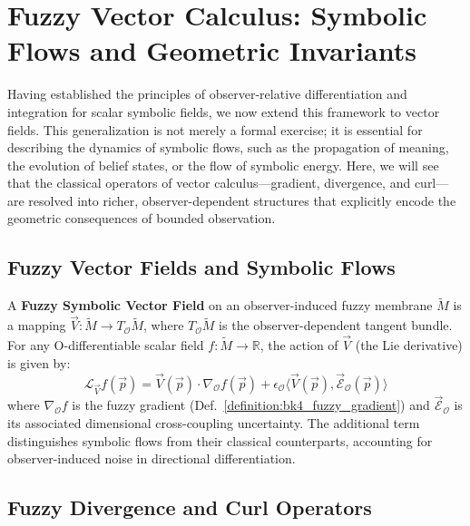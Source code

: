 \section[Fuzzy Vector Calculus]{Fuzzy Vector Calculus: Symbolic Flows and Geometric Invariants}
\label{sec:bk4_fuzzy_vector_calculus}

Having established the principles of observer-relative differentiation and integration for scalar symbolic fields, we now extend this framework to vector fields. This generalization is not merely a formal exercise; it is essential for describing the dynamics of symbolic flows, such as the propagation of meaning, the evolution of belief states, or the flow of symbolic energy. Here, we will see that the classical operators of vector calculus---gradient, divergence, and curl---are resolved into richer, observer-dependent structures that explicitly encode the geometric consequences of bounded observation.

\subsection{Fuzzy Vector Fields and Symbolic Flows}
\label{subsec:bk4_fuzzy_vector_fields}

\begin{definition}
\label{definition:bk4_fuzzy_vector_field}
A \textbf{Fuzzy Symbolic Vector Field} on an observer-induced fuzzy membrane $\tilde{M}$ is a mapping $\vec{V}: \tilde{M} \to T_{\mathcal{O}}\tilde{M}$, where $T_{\mathcal{O}}\tilde{M}$ is the observer-dependent tangent bundle. For any O-differentiable scalar field $f: \tilde{M} \to \mathbb{R}$, the action of $\vec{V}$ (the Lie derivative) is given by:
\[
\mathcal{L}_{\vec{V}} f(\vec{p}) = \vec{V}(\vec{p}) \cdot \nabla_{\mathcal{O}} f(\vec{p}) + \epsilon_{\mathcal{O}} \langle \vec{V}(\vec{p}), \vec{\mathcal{E}}_{\mathcal{O}}(\vec{p}) \rangle
\]
where $\nabla_{\mathcal{O}}f$ is the fuzzy gradient (Def.~\ref{definition:bk4_fuzzy_gradient}) and $\vec{\mathcal{E}}_{\mathcal{O}}$ is its associated dimensional cross-coupling uncertainty. The additional term distinguishes symbolic flows from their classical counterparts, accounting for observer-induced noise in directional differentiation.
\end{definition}

\subsection{Fuzzy Divergence and Curl Operators}
\label{subsec:bk4_fuzzy_div_curl}

